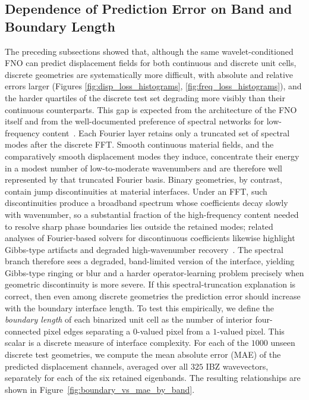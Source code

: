 \documentclass[preprint,review,12pt,numafflabel]{elsarticle}
\begin{document}
\subsection{Dependence of Prediction Error on Band and Boundary Length}
\label{ssec:boundary_length_vs_loss}

The preceding subsections showed that, although the same wavelet-conditioned FNO can predict displacement fields for both continuous and discrete unit cells, discrete geometries are systematically more difficult, with absolute and relative errors larger (Figures \ref{fig:disp_loss_histograms}, \ref{fig:freq_loss_histograms}), and the harder quartiles of the discrete test set degrading more visibly than their continuous counterparts. This gap is expected from the architecture of the FNO itself and from the well-documented preference of spectral networks for low-frequency content~\cite{rahaman2019spectral,qin2024spectralfno}. Each Fourier layer retains only a truncated set of spectral modes after the discrete FFT. Smooth continuous material fields, and the comparatively smooth displacement modes they induce, concentrate their energy in a modest number of low-to-moderate wavenumbers and are therefore well represented by that truncated Fourier basis. Binary geometries, by contrast, contain jump discontinuities at material interfaces. Under an FFT, such discontinuities produce a broadband spectrum whose coefficients decay slowly with wavenumber, so a substantial fraction of the high-frequency content needed to resolve sharp phase boundaries lies outside the retained modes; related analyses of Fourier-based solvers for discontinuous coefficients likewise highlight Gibbs-type artifacts and degraded high-wavenumber recovery~\cite{cavallazzi2026whno}. The spectral branch therefore sees a degraded, band-limited version of the interface, yielding Gibbs-type ringing or blur and a harder operator-learning problem precisely when geometric discontinuity is more severe.
If this spectral-truncation explanation is correct, then even among discrete geometries the prediction error should increase with the boundary interface length. To test this empirically, we define the \emph{boundary length} of each binarized unit cell as the number of interior four-connected pixel edges separating a $0$-valued pixel from a $1$-valued pixel. This scalar is a discrete measure of interface complexity. For each of the $1000$ unseen discrete test geometries, we compute the mean absolute error (MAE) of the predicted displacement channels, averaged over all $325$ IBZ wavevectors, separately for each of the six retained eigenbands. The resulting relationships are shown in Figure~\ref{fig:boundary_vs_mae_by_band}.
\end{document}
